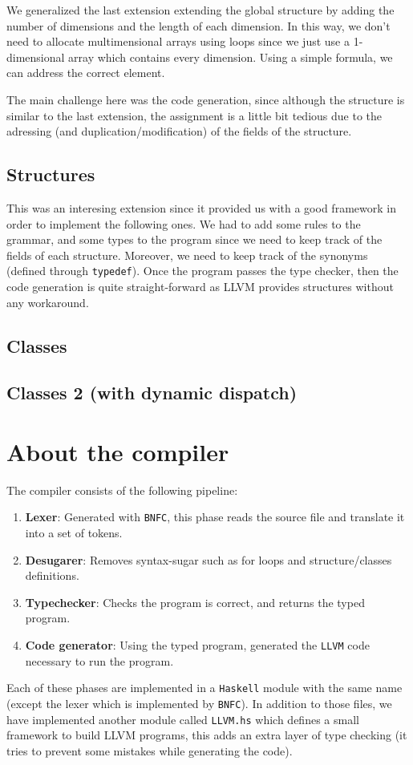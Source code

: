 \documentclass{article}
\begin{document}
We generalized the last extension extending the global structure by adding the number of dimensions and the length of each dimension. In this way, we don't need to allocate multimensional arrays using loops since we just use a 1-dimensional array which contains every dimension. Using a simple formula, we can address the correct element.

    The main challenge here was the code generation, since although the structure is similar to the last extension, the assignment is a little bit tedious due to the adressing (and duplication/modification) of the fields of the structure. 
\subsection{Structures}

This was an interesing extension since it provided us with a good framework in order to implement the following ones. We had to add some rules to the grammar, and some types to the program since we need to keep track of the fields of each structure. Moreover, we need to keep track of the synonyms (defined through \texttt{typedef}). Once the program passes the type checker, then the code generation is quite straight-forward as LLVM provides structures without any workaround.
\subsection{Classes}
\subsection{Classes 2 (with dynamic dispatch)}

\section{About the compiler}

The compiler consists of the following pipeline:

\begin{enumerate}
 \item {\bf Lexer}: Generated with \texttt{BNFC}, this phase reads the source file and translate it into a set of tokens.
 \item {\bf Desugarer}: Removes syntax-sugar such as for loops and structure/classes definitions.
 \item {\bf Typechecker}: Checks the program is correct, and returns the typed program.
 \item {\bf Code generator}: Using the typed program, generated the \texttt{LLVM} code necessary to run the program.
\end{enumerate}

Each of these phases are implemented in a \texttt{Haskell} module with the same name (except the lexer which is implemented by \texttt{BNFC}). In addition to those files, we have implemented another module called \texttt{LLVM.hs} which defines a small framework to build LLVM programs, this adds an extra layer of type checking (it tries to prevent some mistakes while generating the code).
\end{document}
